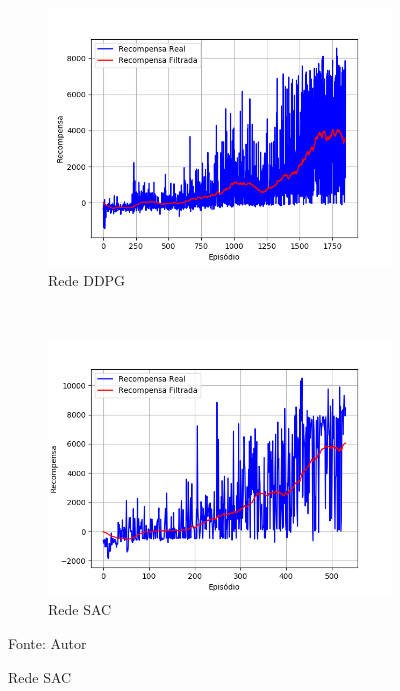 \vspace{0.25cm}
\begin{figure}[H]
\caption{Recompensas do segundo ambiente simulado}
    \begin{center}
    \begin{subfigure}[b]{0.48\textwidth}
        \includegraphics[width=\textwidth]{imagens/simulated_envs/ddpg_stage_2.png}
        \caption{Rede DDPG}
        \label{subfig:ddpg_stage_2}
    \end{subfigure}
    ~
    \begin{subfigure}[b]{0.48\textwidth}
        \includegraphics[width=\textwidth]{imagens/simulated_envs/sac_stage_2.png}
        \caption{Rede SAC}
        \label{subfig:sac_stage_2}
    \end{subfigure}
    \end{center}
    \label{fig:stage_2}
\small{Fonte: Autor}
\end{figure}

